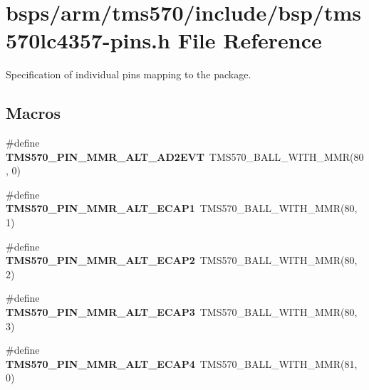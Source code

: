 \hypertarget{tms570lc4357-pins_8h}{}\section{bsps/arm/tms570/include/bsp/tms570lc4357-\/pins.h File Reference}
\label{tms570lc4357-pins_8h}


Specification of individual pins mapping to the package.  


\subsection*{Macros}
\begin{DoxyCompactItemize}
\item 
\mbox{\label{tms570lc4357-pins_8h_a9f0104e8e7f9970a97ef737c1199fff5}} 
\#define {\bfseries T\+M\+S570\+\_\+\+P\+I\+N\+\_\+\+M\+M\+R\+\_\+\+A\+L\+T\+\_\+\+A\+D2\+E\+VT}~T\+M\+S570\+\_\+\+B\+A\+L\+L\+\_\+\+W\+I\+T\+H\+\_\+\+M\+MR(80, 0)
\item 
\mbox{\label{tms570lc4357-pins_8h_aec9f04f7e77e6bcb2e7e08368a6376d0}} 
\#define {\bfseries T\+M\+S570\+\_\+\+P\+I\+N\+\_\+\+M\+M\+R\+\_\+\+A\+L\+T\+\_\+\+E\+C\+A\+P1}~T\+M\+S570\+\_\+\+B\+A\+L\+L\+\_\+\+W\+I\+T\+H\+\_\+\+M\+MR(80, 1)
\item 
\mbox{\label{tms570lc4357-pins_8h_a75ee6f71ddd5b1e85d64cfca1854fff9}} 
\#define {\bfseries T\+M\+S570\+\_\+\+P\+I\+N\+\_\+\+M\+M\+R\+\_\+\+A\+L\+T\+\_\+\+E\+C\+A\+P2}~T\+M\+S570\+\_\+\+B\+A\+L\+L\+\_\+\+W\+I\+T\+H\+\_\+\+M\+MR(80, 2)
\item 
\mbox{\label{tms570lc4357-pins_8h_a40c01bd5d29876cac28afd901d560183}} 
\#define {\bfseries T\+M\+S570\+\_\+\+P\+I\+N\+\_\+\+M\+M\+R\+\_\+\+A\+L\+T\+\_\+\+E\+C\+A\+P3}~T\+M\+S570\+\_\+\+B\+A\+L\+L\+\_\+\+W\+I\+T\+H\+\_\+\+M\+MR(80, 3)
\item 
\mbox{\label{tms570lc4357-pins_8h_a12247f39f530d0e67198301013339b07}} 
\#define {\bfseries T\+M\+S570\+\_\+\+P\+I\+N\+\_\+\+M\+M\+R\+\_\+\+A\+L\+T\+\_\+\+E\+C\+A\+P4}~T\+M\+S570\+\_\+\+B\+A\+L\+L\+\_\+\+W\+I\+T\+H\+\_\+\+M\+MR(81, 0)
\item 
\mbox{\label{tms570lc4357-pins_8h_a7e956d6174deb248715fe9dd6a387e68}} 

\end{DoxyCompactItemize}
